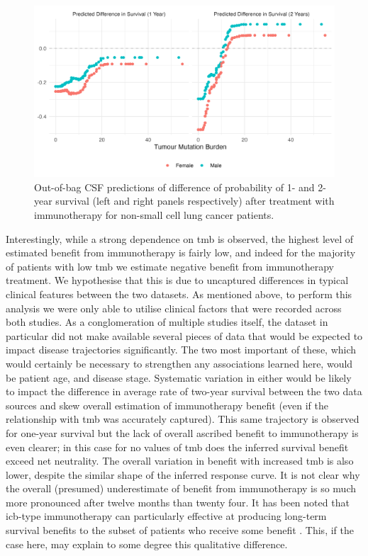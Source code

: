 \documentclass[../thesis.tex]{subfiles}
\begin{document}
\begin{figure}[!tpb] 
\centering
\includegraphics[width=\textwidth]{figures/chapter4/immuno_train_samples_hte_predictions.png} 

\caption{Out-of-bag CSF predictions of difference of probability of 1- and 2-year survival (left and right panels respectively) after treatment with immunotherapy for non-small cell lung cancer patients.  \label{fig:immuno_train_samples_hte_predictions}}
\end{figure}


Interestingly, while a strong dependence on \gls{tmb} is observed, the highest level of estimated benefit from immunotherapy is fairly low, and indeed for the majority of patients with low \gls{tmb} we estimate negative benefit from immunotherapy treatment. We hypothesise that this is due to uncaptured differences in typical clinical features between the two datasets. As mentioned above, to perform this analysis we were only able to utilise clinical factors that were recorded across both studies. As a conglomeration of multiple studies itself, the \citet{zehir_mutational_2017} dataset in particular did not make available several pieces of data that would be expected to impact disease trajectories significantly. The two most important of these, which would certainly be necessary to strengthen any associations learned here, would be patient age, and disease stage. Systematic variation in either would be likely to impact the difference in average rate of two-year survival between the two data sources and skew overall estimation of immunotherapy benefit (even if the relationship with \gls{tmb} was accurately captured). This same trajectory is observed for one-year survival but the lack of overall ascribed benefit to immunotherapy is even clearer; in this case for no values of \gls{tmb} does the inferred survival benefit exceed net neutrality. The overall variation in benefit with increased \gls{tmb} is also lower, despite the similar shape of the inferred response curve. It is not clear why the overall (presumed) underestimate of benefit from immunotherapy is so much more pronounced after twelve months than twenty four. It has been noted that \gls{icb}-type immunotherapy can particularly effective at producing long-term survival benefits to the subset of patients who receive some benefit \citep{putzu_duration_2023}. This, if the case here, may explain to some degree this qualitative difference. 
\end{document}

